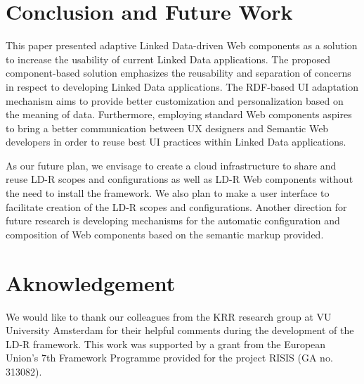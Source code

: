 \documentclass{acm_proc_article-sp}
\begin{document}
\section{Conclusion and Future Work}
This paper presented adaptive Linked Data-driven Web components as a solution to increase the usability of current Linked Data applications.
The proposed component-based solution emphasizes the reusability and separation of concerns in respect to developing Linked Data applications.
The RDF-based UI adaptation mechanism aims to provide better customization and personalization based on the meaning of data.
Furthermore, employing standard Web components aspires to bring a better communication between UX designers and Semantic Web developers in order to reuse best UI practices within Linked Data applications.

As our future plan, we envisage to create a cloud infrastructure to share and reuse LD-R scopes and configurations as well as LD-R Web components without the need to install the framework.
We also plan to make a user interface to facilitate creation of the LD-R scopes and configurations.
Another direction for future research is developing mechanisms for the automatic configuration and composition of Web components based on the semantic markup provided.

\section{Aknowledgement}
We would like to thank our colleagues from the KRR research group at VU University Amsterdam for their helpful comments during the development of the LD-R framework. This work was supported by a grant from the European Union's 7th Framework Programme provided for the project RISIS (GA no. 313082).

\clearpage



\end{document}
